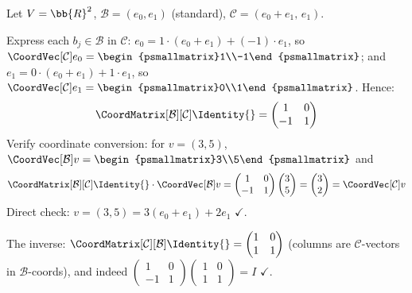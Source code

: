 \begin{example}
\label{ex:cob-R2}
    Let $V = \bb{R}^2$, $\mathcal{B} = (e_0, e_1)$ (standard),
    $\mathcal{C} = (e_0 + e_1,\, e_1)$.

    Express each $b_j \in \mathcal{B}$ in $\mathcal{C}$:
    $e_0 = 1 \cdot (e_0+e_1) + (-1) \cdot e_1$, so
    $\CoordVec[\mathcal{C}]{e_0} = \begin{psmallmatrix}1\\-1\end{psmallmatrix}$; and
    $e_1 = 0 \cdot (e_0+e_1) + 1 \cdot e_1$, so
    $\CoordVec[\mathcal{C}]{e_1} = \begin{psmallmatrix}0\\1\end{psmallmatrix}$.
    Hence:
    \[
        \CoordMatrix[\mathcal{B}][\mathcal{C}]{\Identity{}}
        = \begin{pmatrix} 1 & 0 \\ -1 & 1 \end{pmatrix}
    \]
    Verify coordinate conversion: for $v = (3,5)$,
    $\CoordVec[\mathcal{B}]{v} = \begin{psmallmatrix}3\\5\end{psmallmatrix}$ and
    \[
        \CoordMatrix[\mathcal{B}][\mathcal{C}]{\Identity{}}
        \cdot \CoordVec[\mathcal{B}]{v}
        = \begin{pmatrix}1&0\\-1&1\end{pmatrix}\begin{pmatrix}3\\5\end{pmatrix}
        = \begin{pmatrix}3\\2\end{pmatrix}
        = \CoordVec[\mathcal{C}]{v}
    \]
    Direct check: $v = (3,5) = 3(e_0+e_1) + 2 e_1$ $\checkmark$.

    The inverse:
    $\CoordMatrix[\mathcal{C}][\mathcal{B}]{\Identity{}}
    = \begin{pmatrix}1&0\\1&1\end{pmatrix}$ (columns are $\mathcal{C}$-vectors in
    $\mathcal{B}$-coords), and indeed
    $\begin{pmatrix}1&0\\-1&1\end{pmatrix}
     \begin{pmatrix}1&0\\1&1\end{pmatrix}
     = I$ $\checkmark$.
\end{example}

